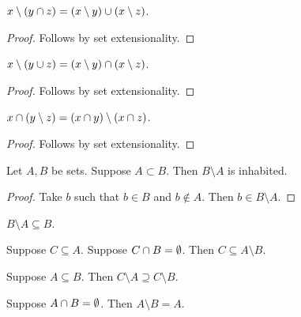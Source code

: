 \begin{proposition}\label{setminus_inter}
    $x\setminus (y\cap z) = (x\setminus y)\cup (x\setminus z)$.
\end{proposition}
\begin{proof}
    Follows by set extensionality.
\end{proof}

\begin{proposition}\label{setminus_union}
    $x\setminus (y\cup z) = (x\setminus y)\cap (x\setminus z)$.
\end{proposition}
\begin{proof}
    Follows by set extensionality.
\end{proof}

\begin{proposition}\label{inter_setminus}
    $x\cap (y\setminus z) = (x\cap y)\setminus (x\cap z)$.
\end{proposition}
\begin{proof}
    Follows by set extensionality.
\end{proof}

\begin{proposition}%
\label{difference_with_proper_subset_is_inhabited}
    Let $A, B$ be sets.
    Suppose $A\subset B$.
    Then $B\setminus A$ is inhabited.
\end{proposition}
\begin{proof}
    Take $b$ such that $b\in B$ and $b\notin A$.
    Then $b\in B\setminus A$.
\end{proof}

\begin{proposition}\label{setminus_subseteq}
    $B\setminus A\subseteq B$.
\end{proposition}

\begin{proposition}\label{subseteq_setminus}
    Suppose $C\subseteq A$.
    Suppose $C\cap B = \emptyset$.
    Then $C\subseteq A\setminus B$.
\end{proposition}


\begin{proposition}\label{subseteq_implies_setminus_supseteq}
    Suppose $A\subseteq B$.
    Then $C\setminus A\supseteq C\setminus B$.
\end{proposition}

\begin{proposition}\label{setminus_absorb_right}
    Suppose $A\cap B = \emptyset$.
    Then $A\setminus B = A$.
\end{proposition}

